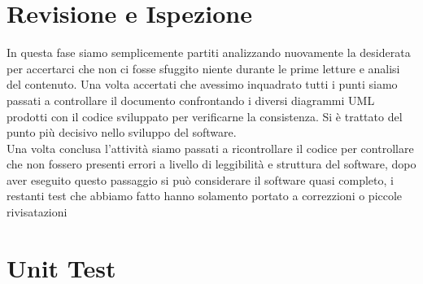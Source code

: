 \documentclass[a4paper, 11pt,oneside]{book}
\begin{document}
    \section{Revisione e Ispezione}
        In questa fase siamo semplicemente partiti analizzando nuovamente la desiderata per accertarci che non ci fosse sfuggito niente durante le prime letture e analisi del contenuto. Una volta accertati che avessimo inquadrato tutti i punti siamo passati a controllare il documento
        confrontando i diversi diagrammi UML prodotti con il codice sviluppato per verificarne la consistenza. Si è trattato del punto più decisivo nello sviluppo del software.\\
        Una volta conclusa l'attività siamo passati a ricontrollare il codice per controllare che non fossero presenti errori a livello di leggibilità e struttura del software, dopo aver eseguito questo passaggio si può considerare il software quasi completo, i restanti test che abbiamo fatto
        hanno solamento portato a correzzioni o piccole rivisatazioni
    \section{Unit Test}
\end{document}
